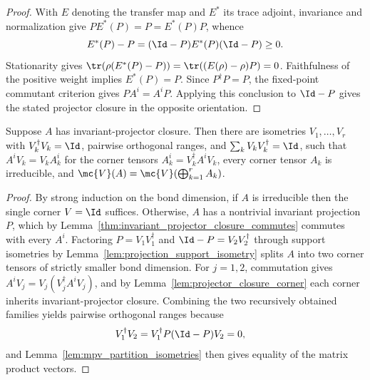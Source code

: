 \begin{proof}
    \leanok
    With $E$ denoting the transfer map and $E^*$ its trace adjoint,
    invariance and normalization give $PE^*(P)=P=E^*(P)P$, whence
    \[
        E^*(P)-P=(\Id-P)E^*(P)(\Id-P)\geq0.
    \]
    Stationarity gives
    $\tr(\rho(E^*(P)-P))=\tr((E(\rho)-\rho)P)=0$.
    Faithfulness of the positive weight implies $E^*(P)=P$.
    Since $P^\dagger P=P$, the fixed-point commutant criterion gives
    $PA^i=A^iP$. Applying this conclusion to $\Id-P$ gives the
    stated projector closure in the opposite orientation.
\end{proof}


\begin{lemma}
    \label{thm:projector_closure_irreducible_corners}
    \leanok
    Suppose $A$ has invariant-projector closure. Then there are isometries
    $V_1,\ldots,V_r$ with $V_k^\dagger V_k=\Id$, pairwise orthogonal ranges,
    and $\sum_kV_kV_k^\dagger=\Id$, such that $A^iV_k=V_kA_k^i$ for the
    corner tensors $A_k^i=V_k^\dagger A^iV_k$, every corner tensor $A_k$ is
    irreducible, and $\mc{V}(A)=\mc{V}(\bigoplus_{k=1}^rA_k)$.
\end{lemma}

\begin{proof}
    \leanok
    By strong induction on the bond dimension, if $A$ is irreducible then
    the single corner $V=\Id$ suffices. Otherwise, $A$ has a nontrivial
    invariant projection $P$, which by
    Lemma~\ref{thm:invariant_projector_closure_commutes} commutes with
    every $A^i$. Factoring $P=V_1V_1^\dagger$ and $\Id-P=V_2V_2^\dagger$
    through support isometries by Lemma~\ref{lem:projection_support_isometry}
    splits $A$ into two corner tensors of strictly smaller bond dimension. For
    $j=1,2$, commutation gives $A^iV_j=V_j(V_j^\dagger A^iV_j)$, and by
    Lemma~\ref{lem:projector_closure_corner} each corner inherits
    invariant-projector closure. Combining the two recursively obtained
    families yields pairwise orthogonal ranges because
    \begin{align}
        V_1^\dagger V_2
         & =V_1^\dagger P(\Id-P)V_2
        =0,
        \notag
    \end{align}
    and Lemma~\ref{lem:mpv_partition_isometries} then gives equality of the
    matrix product vectors.
\end{proof}

